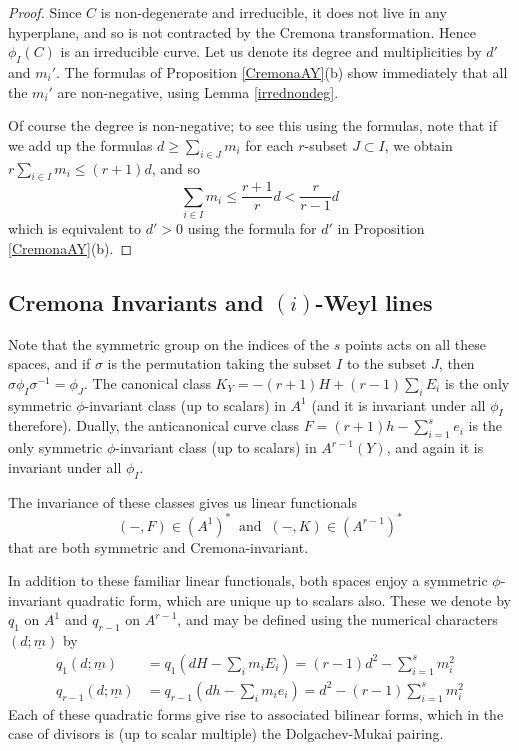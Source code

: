 \documentclass[12pt]{article}
\numberwithin{equation}{section}
\numberwithin{equation}{section}
\numberwithin{subeq}{equation}
\begin{document}
\begin{proof}
Since $C$ is non-degenerate and irreducible, it does not live in any hyperplane,
and so is not contracted by the Cremona transformation.
Hence $\phi_I(C)$ is an irreducible curve.
Let us denote its degree and multiplicities by $d'$ and $m_i'$.
The formulas of Proposition \ref{CremonaAY}(b)
show immediately that all the $m_i'$ are non-negative, using Lemma \ref{irrednondeg}.

Of course the degree is non-negative; to see this using the formulas,
note that if we add up the formulas $d \geq \sum_{i\in J} m_i$
for each $r$-subset $J \subset I$, we obtain
$r\sum_{i\in I} m_i \leq (r+1) d$, and so
\[
\sum_{i\in I} m_i \leq \frac{r+1}{r} d < \frac{r}{r-1} d
\]
which is equivalent to $d' > 0$ using the formula for $d'$ in Proposition \ref{CremonaAY}(b).
\end{proof}

\subsection{Cremona Invariants and $(i)$-Weyl lines}\label{bilinear form section}
Note that the symmetric group on the indices of the $s$ points
acts on all these spaces,
and if $\sigma$ is the permutation taking the subset $I$ to the subset $J$,
then $\sigma \phi_I \sigma^{-1} = \phi_J$.
The canonical class $K_Y = -(r+1)H + (r-1)\sum_i E_i$ is the only symmetric $\phi$-invariant class
(up to scalars) in $A^1$ (and it is invariant under all $\phi_I$ therefore).
Dually, the anticanonical curve class $F =(r+1)h - \sum_{i=1}^s e_i $
is the only symmetric $\phi$-invariant class (up to scalars) in $A^{r-1}(Y)$,
and again it is invariant under all $\phi_I$.

The invariance of these classes gives us linear functionals
\[
(-,F)\in (A^1)^* \;\;\text{and}\;\; (-,K) \in (A^{r-1})^*
\]
that are both symmetric and Cremona-invariant.

In addition to these familiar linear functionals, both spaces enjoy a symmetric $\phi$-invariant quadratic form,
which are unique up to scalars also.
These we denote by $q_1$ on $A^1$ and $q_{r-1}$ on $A^{r-1}$, and may be defined using the numerical characters
$(d;\underline{m})$ by
\begin{align}
q_1(d;\underline{m}) &= q_1(dH - \sum_i m_i  E_i) = (r-1)d^2 - \sum_{i=1}^s m_i^2 \label{q1}\\
q_{r-1}(d;\underline{m}) &= q_{r-1}(dh - \sum_i m_i e_i) =d^2 - (r-1)\sum_{i=1}^s m_i^2 \label{qr-1}
\end{align}
Each of these quadratic forms give rise to associated bilinear forms,
which in the case of divisors is (up to scalar multiple) the Dolgachev-Mukai pairing.
\end{document}
